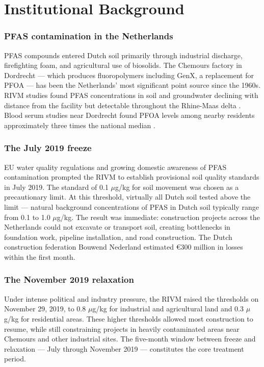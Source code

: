 \documentclass[12pt]{article}
\begin{document}
\section{Institutional Background}

\subsubsection*{PFAS contamination in the Netherlands} PFAS compounds entered Dutch soil primarily through industrial discharge, firefighting foam, and agricultural use of biosolids. The Chemours factory in Dordrecht --- which produces fluoropolymers including GenX, a replacement for PFOA --- has been the Netherlands' most significant point source since the 1960s. RIVM studies found PFAS concentrations in soil and groundwater declining with distance from the facility but detectable throughout the Rhine-Maas delta \citep{rivm2019pfas}. Blood serum studies near Dordrecht found PFOA levels among nearby residents approximately three times the national median \citep{zeilmaker2020pfas}.

\subsubsection*{The July 2019 freeze} EU water quality regulations and growing domestic awareness of PFAS contamination prompted the RIVM to establish provisional soil quality standards in July 2019. The standard of 0.1 $\mu$g/kg for soil movement was chosen as a precautionary limit. At this threshold, virtually all Dutch soil tested above the limit --- natural background concentrations of PFAS in Dutch soil typically range from 0.1 to 1.0 $\mu$g/kg. The result was immediate: construction projects across the Netherlands could not excavate or transport soil, creating bottlenecks in foundation work, pipeline installation, and road construction. The Dutch construction federation Bouwend Nederland estimated \euro{}300 million in losses within the first month.

\subsubsection*{The November 2019 relaxation} Under intense political and industry pressure, the RIVM raised the thresholds on November 29, 2019, to 0.8 $\mu$g/kg for industrial and agricultural land and 0.3 $\mu$g/kg for residential areas. These higher thresholds allowed most construction to resume, while still constraining projects in heavily contaminated areas near Chemours and other industrial sites. The five-month window between freeze and relaxation --- July through November 2019 --- constitutes the core treatment period.
\end{document}

